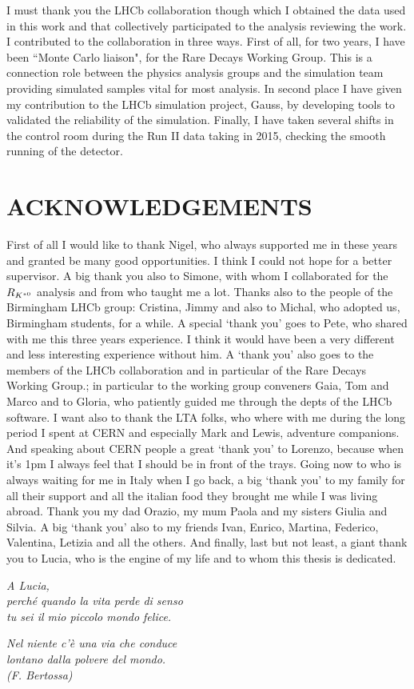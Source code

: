 I must thank you the LHCb collaboration though which I obtained the data used in this work
and that collectively participated to the analysis reviewing the work. I contributed to the collaboration
in three ways. First of all, for two years, I have been ``Monte Carlo liaison", for the Rare Decays Working
Group. This is a connection role between the physics analysis groups and the simulation team providing
simulated samples vital for most analysis. In second place I have given my contribution to the LHCb
simulation project, Gauss, by developing tools to validated the reliability of the simulation. Finally, I have
taken several shifts in the control room during the Run II data taking in 2015, checking the smooth
running of the detector.
%
\clearpage
\chapter*{ACKNOWLEDGEMENTS}
%
First of all I would like to thank Nigel, who always supported me in these years and
granted be many good opportunities. I think I could not hope for a better supervisor.
A big thank you also to Simone, with whom I collaborated for the $R_{K^{*0}}$ analysis
and from who taught me a lot. Thanks also to the people of the Birmingham LHCb group:
Cristina, Jimmy and also to Michal, who adopted us, Birmingham students, for a while.
A special `thank you' goes to Pete, who shared with me this three years experience.
I think it would have been a very different and less interesting experience without him.
A `thank you' also goes to the members of the LHCb collaboration and in particular of the Rare
Decays Working Group.; in particular to the working group conveners Gaia, Tom and Marco
and to Gloria, who patiently guided me through the depts of the LHCb software.
I want also to thank the LTA folks, who where with me during the long period I spent at CERN
and especially Mark and Lewis, adventure companions. And speaking about CERN people
a great `thank you' to Lorenzo, because when it's 1pm I always feel that I should be in front of the trays.
Going now to who is always waiting for me in Italy when I go back, a big `thank you' to my
family for all their support and all the italian food they brought me while I was living abroad.
Thank you my dad Orazio, my mum Paola and my sisters Giulia and
Silvia. A big `thank you' also to my friends Ivan, Enrico, Martina, Federico, Valentina, Letizia
and all the others. And finally, last but not least, a giant thank you to Lucia, who is the engine
of my life and to whom this thesis is dedicated.
%
\cleardoublepage
~

\begin{flushright}
  \emph{A Lucia, \\
  perch\'{e} quando la vita perde di senso \\
  tu sei il mio piccolo mondo felice.}
  
  \vspace{10cm}
  
   \emph{Nel niente c'\`{e} una via che conduce \\
   lontano dalla polvere del mondo.\\
   (F. Bertossa)
   } 
\end{flushright}

\cleardoublepage

